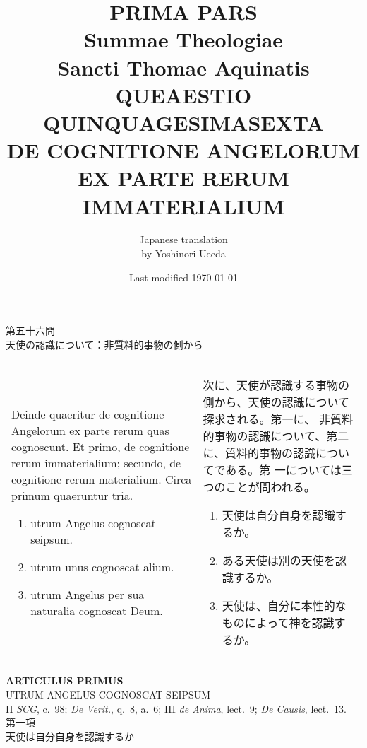 \documentclass[10pt]{jsarticle} %
\title{{\bf PRIMA PARS}\\{\HUGE Summae Theologiae}\\Sancti Thomae
Aquinatis\\{\sffamily QUEAESTIO QUINQUAGESIMASEXTA}\\DE COGNITIONE
ANGELORUM EX PARTE RERUM IMMATERIALIUM}
\author{Japanese translation\\by Yoshinori {\sc Ueeda}}
\date{Last modified \today}
\begin{document}
\maketitle
\pagestyle{fancy}

\begin{center}
{\Large 第五十六問\\天使の認識について：非質料的事物の側から}
\end{center}

\begin{longtable}{p{21em}p{21em}}
Deinde quaeritur de cognitione Angelorum ex parte rerum quas
cognoscunt. Et primo, de cognitione rerum immaterialium; secundo, de
cognitione rerum materialium. Circa primum quaeruntur tria.

\begin{enumerate}
\item utrum Angelus cognoscat seipsum.
\item utrum unus cognoscat alium.
\item utrum Angelus per sua naturalia cognoscat Deum.
\end{enumerate}


&

次に、天使が認識する事物の側から、天使の認識について探求される。第一に、
非質料的事物の認識について、第二に、質料的事物の認識についてである。第
一については三つのことが問われる。

\begin{enumerate}
 \item 天使は自分自身を認識するか。
 \item ある天使は別の天使を認識するか。
 \item 天使は、自分に本性的なものによって神を認識するか。
\end{enumerate}

\end{longtable}
\newpage

\begin{center}
{\Large {\bf ARTICULUS PRIMUS}}\\ {\large UTRUM ANGELUS COGNOSCAT
SEIPSUM}\\ {\footnotesize II {\itshape SCG}, c.~98; {\itshape De
Verit.}, q.~8, a.~6; III {\itshape de Anima}, lect.~9; {\itshape De
Causis}, lect.~13.}\\ {\Large 第一項\\天使は自分自身を認識するか}
\end{center}
\end{document}
